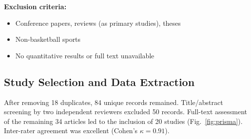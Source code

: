 \documentclass[conference]{IEEEtran}
\begin{document}
\textbf{Exclusion criteria:}
\begin{itemize}
    \item Conference papers, reviews (as primary studies), theses
    \item Non-basketball sports
    \item No quantitative results or full text unavailable
\end{itemize}

\subsection{Study Selection and Data Extraction}
After removing 18 duplicates, 84 unique records remained. Title/abstract screening by two independent reviewers excluded 50 records. Full-text assessment of the remaining 34 articles led to the inclusion of 20 studies (Fig.~\ref{fig:prisma}). Inter-rater agreement was excellent (Cohen's $\kappa = 0.91$).
\end{document}
